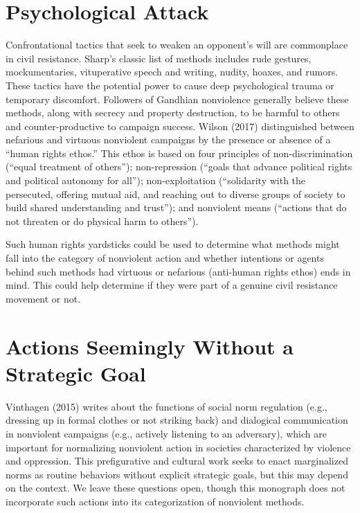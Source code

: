 \documentclass[twoside,a4paper,12pt,fleqn,openany]{extbook}
\begin{document}
\section*{Psychological Attack}

Confrontational tactics that seek to weaken an opponent’s will are commonplace in civil resistance. Sharp’s classic list of methods includes rude gestures, mockumentaries, vituperative speech and writing, nudity, hoaxes, and rumors. These tactics have the potential power to cause deep psychological trauma or temporary discomfort. Followers of Gandhian nonviolence generally believe these methods, along with secrecy and property destruction, to be harmful to others and counter-productive to campaign success. Wilson (2017) distinguished between nefarious and virtuous nonviolent campaigns by the presence or absence of a “human rights ethos.” This ethos is based on four principles of non-discrimination (“equal treatment of others”); non-repression (“goals that advance political rights and political autonomy for all”); non-exploitation (“solidarity with the persecuted, offering mutual aid, and reaching out to diverse groups of society to build shared understanding and trust”); and nonviolent means (“actions that do not threaten or do physical harm to others”).

Such human rights yardsticks could be used to determine what methods might fall into the category of nonviolent action and whether intentions or agents behind such methods had virtuous or nefarious (anti-human rights ethos) ends in mind. This could help determine if they were part of a genuine civil resistance movement or not.

\section*{Actions Seemingly Without a Strategic Goal}

Vinthagen (2015) writes about the functions of social norm regulation (e.g., dressing up in formal clothes or not striking back) and dialogical communication in nonviolent campaigns (e.g., actively listening to an adversary), which are important for normalizing nonviolent action in societies characterized by violence and oppression. This prefigurative and cultural work seeks to enact marginalized norms as routine behaviors without explicit strategic goals, but this may depend on the context. We leave these questions open, though this monograph does not incorporate such actions into its categorization of nonviolent methods.
\end{document}
